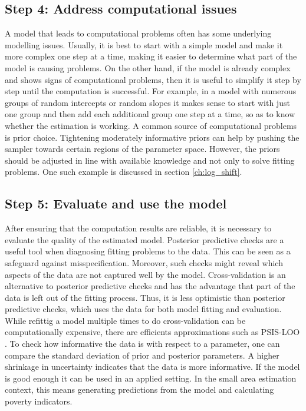 
\subsection{Step 4: Address computational issues}

A model that leads to computational problems often has some underlying modelling issues.
Usually, it is best to start with a simple model and make it more complex one step at a time, making it easier to determine what part of the model is causing problems.
On the other hand, if the model is already complex and shows signs of computational problems, then it is useful to simplify it step by step until the computation is successful.
For example, in a model with numerous groups of random intercepts or random slopes it makes sense to start with just one group and then add each additional group one step at a time, so as to know whether the estimation is working.
A common source of computational problems is prior choice.
Tightening moderately informative priors can help by pushing the sampler towards certain regions of the parameter space.
However, the priors should be adjusted in line with available knowledge and not only to solve fitting problems.
One such example is discussed in section \ref{ch:log_shift}.

\subsection{Step 5: Evaluate and use the model}

After ensuring that the computation results are reliable, it is necessary to evaluate the quality of the estimated model.
Posterior predictive checks are a useful tool when diagnosing fitting problems to the data.
This can be seen as a safeguard against misspecification.
Moreover, such checks might reveal which aspects of the data are not captured well by the model.
Cross-validation is an alternative to posterior predictive checks and has the advantage that part of the data is left out of the fitting process.
Thus, it is less optimistic than posterior predictive checks, which uses the data for both model fitting and evaluation.
While refittig a model multiple times to do cross-validation can be computationally expensive, there are efficients approximations such as PSIS-LOO \citep{vehtari_practical_2017}.
To check how informative the data is with respect to a parameter, one can compare the standard deviation of prior and posterior parameters. A higher shrinkage in uncertainty indicates that the data is more informative.
If the model is good enough it can be used in an applied setting.
In the small area estimation context, this means generating predictions from the model and calculating poverty indicators.

